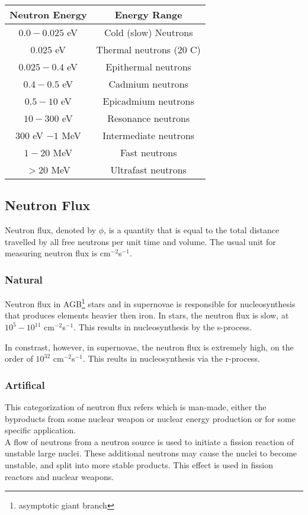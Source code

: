 \documentclass{article}
\begin{document}
\begin{multicols*}{2}
    \begin{tabular}{|c|c|}
      \hline
      \textbf{Neutron Energy} & \textbf{Energy Range} \\
      \hline
      $0.0 - 0.025$ eV & Cold (slow) Neutrons \\
      $0.025$ eV & Thermal neutrons ($20$ C) \\
      $0.025-0.4$ eV & Epithermal neutrons \\
      $0.4-0.5$ eV & Cadmium neutrons \\
      $0.5-10$ eV & Epicadmium neutrons \\
      $10-300$ eV & Resonance neutrons \\
      $300$ eV $- 1$ MeV & Intermediate neutrons \\
      $1-20$ MeV & Fast neutrons \\
      $> 20$ MeV & Ultrafast neutrons \\
      \hline
    \end{tabular}
    \subsection{Neutron Flux}
    Neutron flux, denoted by $\phi$, is a quantity that is equal to the total
    distance travelled by all free neutrons per unit time and volume. The usual
    unit for measuring neutron flux is cm$^{-2}$s$^{-1}$.
    \subsubsection{Natural}
    Neutron flux in AGB\footnote{asymptotic giant branch} stars and in supernovae
    is responsible for nucleosynthesis that produces elements heavier then iron.
    In stars, the neutron flux is slow, at $10^{5} - 10^{11}$ cm$^{-2}$s$^{-1}$.
    This results in nucleosynthesis by the s-process.

    In constrast, however, in supernovae, the neutron flux is extremely high,
    on the order of $10^{32}$ cm$^{-2}$s$^{-1}$. This reults in nucleosynthesis
    via the r-process.
    \subsubsection{Artifical}
    This categorization of neutron flux refers which is man-made, either the
    byproducts from some nuclear weapon or nuclear energy production or for
    some specific application.\\

    A flow of neutrons from a neutron source is used to initiate a fission reaction
    of unstable large nuclei. These additional neutrons may cause the nuclei to
    become unstable, and split into more stable products. This effect is used
    in fission reactors and nuclear weapons.

\end{multicols*}
\end{document}
